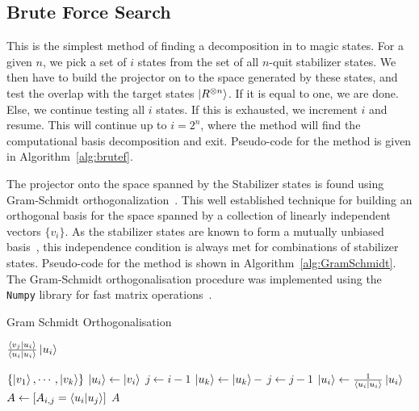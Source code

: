 \documentclass{standalone}
\begin{document}
\subsection{Brute Force Search}
This is the simplest method of finding a decomposition in to magic states. For a given $n$, we pick a set of $i$ states from the set of all $n$-quit stabilizer states. We then have to build the projector on to the space generated by these states, and test the overlap with the target states $\ket{R^{\otimes n}}$. If it is equal to one, we are done. Else, we continue testing all $i$ states. If this is exhausted, we increment $i$ and resume. This will continue up to $i=2^{n}$, where the method will find the computational basis decomposition and exit. Pseudo-code for the method is given in Algorithm~\ref{alg:brutef}.
\par
The projector onto the space spanned by the Stabilizer states is found using Gram-Schmidt orthogonalization~\cite{Nielsen2000}. This well established technique for building an orthogonal basis for the space spanned by a collection of linearly independent vectors $\{v_{i}\}$. As the stabilizer states are known to form a mutually unbiased basis~\cite{Howard2013}, this independence condition is always met for combinations of stabilizer states. Pseudo-code for the method is shown in Algorithm~\ref{alg:GramSchmidt}.\\
The Gram-Schmidt orthogonalisation procedure was implemented using the \texttt{Numpy} library for fast matrix operations~\cite{VanderWalt2011}.  
\begin{algorithm}
\caption{Gram Schmidt Orthogonalisation}
\label{alg:GramSchmidt}
\begin{algorithmic}
    \State \Return $\frac{\braket{v_{j}}{u_{i}}}{\braket{u_{i}}{u_{i}}}\ket{u_{i}}$
\EndFunction
\end{algorithmic}
\begin{algorithmic}[1]
\Require $\{\ket{v_{1}},\cdots,\ket{v_{k}}\}$ 
    \State $\ket{u_{i}}\leftarrow\ket{v_{i}}$
    \State $j\leftarrow i-1$
        \State $\ket{u_{k}} \leftarrow \ket{u_{k}} -$ 
        \State $j\leftarrow j-1$
    \EndWhile
    \State $\ket{u_{i}}\leftarrow \frac{1}{\braket{u_{i}}{u_{i}}}\ket{u_{i}}$ 
\EndFor
\State $A\leftarrow [A_{i,j}=\braket{u_{i}}{u_{j}}]$
\State \Return $A$
\end{algorithmic}
\end{algorithm}
\end{document}
